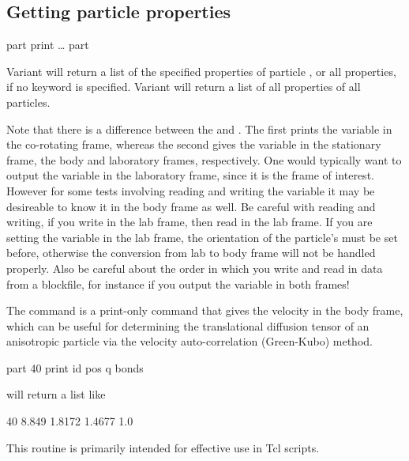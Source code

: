 
\subsection{Getting particle properties}
\begin{essyntax}
  part  print
  \dots
   part
\end{essyntax}

Variant  will return a list of the specified properties of
particle , or all properties, if no keyword is
specified.  Variant  will return a list of all properties
of all particles.

Note that there is a difference between the  and
.  The first prints the variable in the co-rotating
frame, whereas the second gives the variable in the stationary frame,
the body and laboratory frames, respectively. One would typically want
to output the variable in the laboratory frame, since it is the frame
of interest. However for some tests involving reading and writing the
variable it may be desireable to know it in the body frame as well. Be
careful with reading and writing, if you write in the lab frame, then
read in the lab frame. If you are setting the variable in the lab
frame, the orientation of the particle's  must be set
before, otherwise the conversion from lab to body frame will not be
handled properly.  Also be careful about the order in which you write
and read in data from a blockfile, for instance if you output the
variable in both frames!

The  command is a print-only command that
gives the velocity in the body frame, which can be useful for 
determining the translational diffusion tensor of an anisotropic 
particle via the velocity auto-correlation (Green-Kubo) method.

\begin{tclcode}
part 40 print id pos q bonds
\end{tclcode}
will return a list like
\begin{tclcode}
40 8.849 1.8172 1.4677 1.0 {}
\end{tclcode}
This routine is primarily intended for effective use in Tcl scripts.

